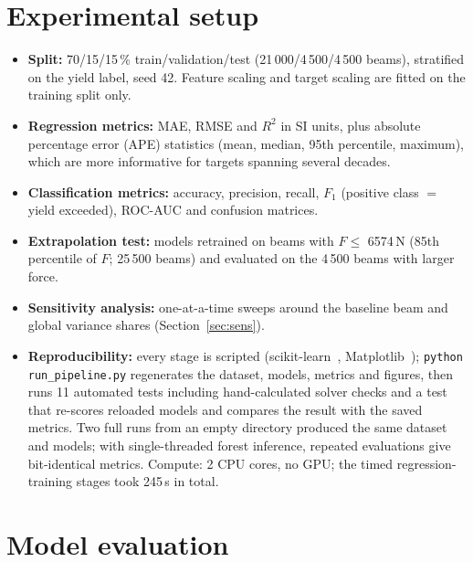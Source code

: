 \documentclass[11pt,a4paper]{article}
\begin{document}
\section{Experimental setup}
\begin{itemize}
\item \textbf{Split:} 70/15/15\,\% train/validation/test (21\,000/4\,500/4\,500 beams), stratified on the yield
label, seed 42. Feature scaling and target scaling are fitted on the training split only.
\item \textbf{Regression metrics:} MAE, RMSE and $R^2$ in SI units, plus absolute percentage error (APE) statistics
(mean, median, 95th percentile, maximum), which are more informative for targets spanning several decades.
\item \textbf{Classification metrics:} accuracy, precision, recall, $F_1$ (positive class $=$ yield exceeded), ROC-AUC
and confusion matrices.
\item \textbf{Extrapolation test:} models retrained on beams with $F\le$ 6574\,N (85th percentile of $F$;
25\,500 beams) and evaluated on the 4\,500 beams with larger force.
\item \textbf{Sensitivity analysis:} one-at-a-time sweeps around the baseline beam and global variance shares (Section~\ref{sec:sens}).
\item \textbf{Reproducibility:} every stage is scripted (scikit-learn~\cite{pedregosa2011}, Matplotlib~\cite{hunter2007}); \texttt{python run\_pipeline.py} regenerates the dataset,
models, metrics and figures, then runs 11 automated tests including hand-calculated solver checks and a test that
re-scores reloaded models and compares the result with the saved metrics. Two full runs from an empty directory
produced the same dataset and models; with single-threaded forest inference, repeated evaluations give bit-identical metrics. Compute: 2 CPU cores, no GPU; the timed regression-training stages took 245\,s in total.
\end{itemize}

\section{Model evaluation}
\end{document}

